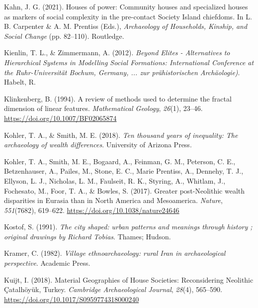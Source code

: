\documentclass[
  12pt,
]{book}
\newlength{\cslhangindent}
\newlength{\cslentryspacingunit} %
\newenvironment{CSLReferences}[2] %
 {%
  \setlength{\parindent}{0pt}
  \ifodd #1
  \let\oldpar\par
  \def\par{\hangindent=\cslhangindent\oldpar}
  \fi
  \setlength{\parskip}{#2\cslentryspacingunit}
 }%
 {}
\begin{document}
\begin{CSLReferences}{1}{0}
\leavevmode{}%
Kahn, J. G. (2021). Houses of power: {Community} houses and specialized houses as markers of social complexity in the pre-contact {Society Island} chiefdoms. In L. B. Carpenter \& A. M. Prentiss (Eds.), \emph{Archaeology of {Households}, {Kinship}, and {Social Change}} (pp. 82--110). {Routledge}.

\leavevmode{}%
Kienlin, T. L., \& Zimmermann, A. (2012). \emph{Beyond Elites - Alternatives to Hierarchical Systems in Modelling Social Formations: International Conference at the Ruhr-Universität Bochum, Germany, ... zur prähistorischen Archäologie)}. Habelt, R.

\leavevmode{}%
Klinkenberg, B. (1994). A review of methods used to determine the fractal dimension of linear features. \emph{Mathematical Geology}, \emph{26}(1), 23--46. \url{https://doi.org/10.1007/BF02065874}

\leavevmode{}%
Kohler, T. A., \& Smith, M. E. (2018). \emph{Ten thousand years of inequality: The archaeology of wealth differences}. University of Arizona Press.

\leavevmode{}%
Kohler, T. A., Smith, M. E., Bogaard, A., Feinman, G. M., Peterson, C. E., Betzenhauser, A., Pailes, M., Stone, E. C., Marie Prentiss, A., Dennehy, T. J., Ellyson, L. J., Nicholas, L. M., Faulseit, R. K., Styring, A., Whitlam, J., Fochesato, M., Foor, T. A., \& Bowles, S. (2017). Greater post-Neolithic wealth disparities in Eurasia than in North America and Mesoamerica. \emph{Nature}, \emph{551}(7682), 619--622. \url{https://doi.org/10.1038/nature24646}

\leavevmode{}%
Kostof, S. (1991). \emph{The city shaped: urban patterns and meanings through history ; original drawings by Richard Tobias}. Thames; Hudson.

\leavevmode{}%
Kramer, C. (1982). \emph{Village ethnoarchaeology: rural Iran in archaeological perspective}. Academic Press.

\leavevmode{}%
Kuijt, I. (2018). Material Geographies of House Societies: Reconsidering Neolithic Çatalhöyük, Turkey. \emph{Cambridge Archaeological Journal}, \emph{28}(4), 565--590. \url{https://doi.org/10.1017/S0959774318000240}


\end{CSLReferences}
\end{document}
